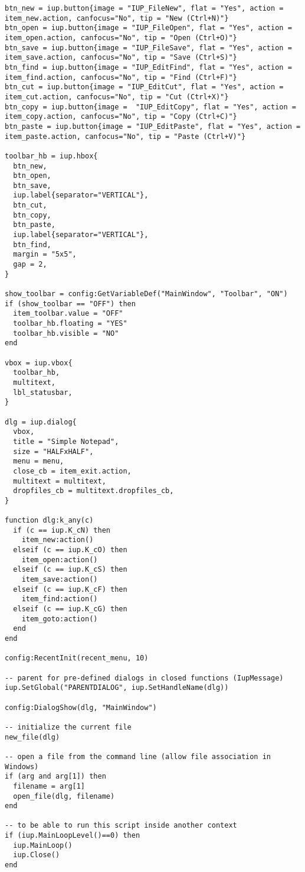\documentclass{ctexart}
\begin{document}
\begin{lstlisting}
btn_new = iup.button{image = "IUP_FileNew", flat = "Yes", action = item_new.action, canfocus="No", tip = "New (Ctrl+N)"}
btn_open = iup.button{image = "IUP_FileOpen", flat = "Yes", action = item_open.action, canfocus="No", tip = "Open (Ctrl+O)"}
btn_save = iup.button{image = "IUP_FileSave", flat = "Yes", action = item_save.action, canfocus="No", tip = "Save (Ctrl+S)"}
btn_find = iup.button{image = "IUP_EditFind", flat = "Yes", action = item_find.action, canfocus="No", tip = "Find (Ctrl+F)"}
btn_cut = iup.button{image = "IUP_EditCut", flat = "Yes", action = item_cut.action, canfocus="No", tip = "Cut (Ctrl+X)"}
btn_copy = iup.button{image =  "IUP_EditCopy", flat = "Yes", action = item_copy.action, canfocus="No", tip = "Copy (Ctrl+C)"}
btn_paste = iup.button{image = "IUP_EditPaste", flat = "Yes", action = item_paste.action, canfocus="No", tip = "Paste (Ctrl+V)"}

toolbar_hb = iup.hbox{
  btn_new,
  btn_open,
  btn_save,
  iup.label{separator="VERTICAL"},
  btn_cut,
  btn_copy,
  btn_paste,
  iup.label{separator="VERTICAL"},
  btn_find, 
  margin = "5x5",
  gap = 2,
}

show_toolbar = config:GetVariableDef("MainWindow", "Toolbar", "ON")
if (show_toolbar == "OFF") then
  item_toolbar.value = "OFF"
  toolbar_hb.floating = "YES"
  toolbar_hb.visible = "NO"
end

vbox = iup.vbox{
  toolbar_hb,
  multitext,
  lbl_statusbar,
}

dlg = iup.dialog{
  vbox,
  title = "Simple Notepad",
  size = "HALFxHALF",
  menu = menu,
  close_cb = item_exit.action,
  multitext = multitext,
  dropfiles_cb = multitext.dropfiles_cb,
}

function dlg:k_any(c)
  if (c == iup.K_cN) then
    item_new:action()
  elseif (c == iup.K_cO) then
    item_open:action()
  elseif (c == iup.K_cS) then
    item_save:action()
  elseif (c == iup.K_cF) then
    item_find:action()
  elseif (c == iup.K_cG) then
    item_goto:action()
  end
end

config:RecentInit(recent_menu, 10)

-- parent for pre-defined dialogs in closed functions (IupMessage)
iup.SetGlobal("PARENTDIALOG", iup.SetHandleName(dlg))

config:DialogShow(dlg, "MainWindow")

-- initialize the current file
new_file(dlg)

-- open a file from the command line (allow file association in Windows)
if (arg and arg[1]) then
  filename = arg[1]
  open_file(dlg, filename)
end

-- to be able to run this script inside another context
if (iup.MainLoopLevel()==0) then
  iup.MainLoop()
  iup.Close()
end
\end{lstlisting}
\end{document}
